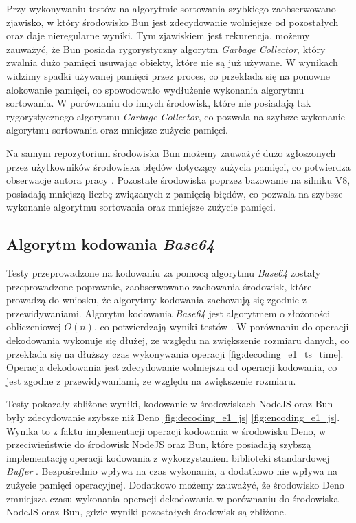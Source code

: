 Przy wykonywaniu testów na algorytmie sortowania szybkiego zaobserwowano zjawisko, w który środowisko Bun jest zdecydowanie wolniejsze od pozostałych oraz daje nieregularne wyniki. Tym zjawiskiem jest rekurencja, możemy zauważyć, że Bun posiada rygorystyczny algorytm \textit{Garbage Collector}, który zwalnia dużo pamięci usuwając obiekty, które nie są już używane. W wynikach widzimy spadki używanej pamięci przez proces, co przekłada się na ponowne alokowanie pamięci, co spowodowało wydłużenie wykonania algorytmu sortowania. W porównaniu do innych środowisk, które nie posiadają tak rygorystycznego algorytmu \textit{Garbage Collector}, co pozwala na szybsze wykonanie algorytmu sortowania oraz mniejsze zużycie pamięci. 

Na samym repozytorium środowiska Bun możemy zauważyć dużo zgłoszonych przez użytkowników środowiska błędów dotyczący zużycia pamięci, co potwierdza obserwacje autora pracy \cite{bun_memory}. Pozostałe środowiska poprzez bazowanie na silniku V8, posiadają mniejszą liczbę związanych z pamięcią błędów, co pozwala na szybsze wykonanie algorytmu sortowania oraz mniejsze zużycie pamięci.

\subsection{Algorytm kodowania \textit{Base64}}
Testy przeprowadzone na kodowaniu za pomocą algorytmu \textit{Base64} zostały przeprowadzone poprawnie, zaobserwowano zachowania środowisk, które prowadzą do wniosku, że algorytmy kodowania zachowują się zgodnie z przewidywaniami. Algorytm kodowania \textit{Base64} jest algorytmem o złożoności obliczeniowej $O(n)$, co potwierdzają wyniki testów \cite{cryptoeprint:2022/361}. W porównaniu do operacji dekodowania wykonuje się dłużej, ze względu na zwiększenie rozmiaru danych, co przekłada się na dłuższy czas wykonywania operacji \ref{fig:decoding_e1_ts_time}. Operacja dekodowania jest zdecydowanie wolniejsza od operacji kodowania, co jest zgodne z przewidywaniami, ze względu na zwiększenie rozmiaru.

Testy pokazały zbliżone wyniki, kodowanie w środowiskach NodeJS oraz Bun były zdecydowanie szybsze niż Deno \ref{fig:decoding_e1_js} \ref{fig:encoding_e1_js}. Wynika to z faktu implementacji operacji kodowania w środowisku Deno, w przeciwieństwie do środowisk NodeJS oraz Bun, które posiadają szybszą implementację operacji kodowania z wykorzystaniem biblioteki standardowej \textit{Buffer} \cite{buffer}. Bezpośrednio wpływa na czas wykonania, a dodatkowo nie wpływa na zużycie pamięci operacyjnej. Dodatkowo możemy zauważyć, że środowisko Deno zmniejsza czasu wykonania operacji dekodowania w porównaniu do środowiska NodeJS oraz Bun, gdzie wyniki pozostałych środowisk są zbliżone.


